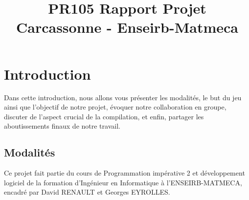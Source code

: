 \documentclass[dvipsnames]{rapportCS}
\title{PR105 Rapport Projet Carcassonne - Enseirb-Matmeca}
\begin{document}






\fairemarges %
\fairepagedegarde %
\setcounter{page}{2}
\setcounter{figure}{0}







\listoffigures
\newpage
\tabledematieres %


\newpage

\section{Introduction}

Dans cette introduction, nous allons vous présenter les modalités, le but du jeu ainsi que l'objectif de notre projet, évoquer notre collaboration en groupe, discuter de l'aspect crucial de la compilation, et enfin, partager les aboutissements finaux de notre travail.

\subsection{Modalités}

Ce projet fait partie du cours de Programmation impérative 2 et développement logiciel de la formation d'Ingénieur en Informatique à l'ENSEIRB-MATMECA, encadré par David RENAULT et Georges EYROLLES.\\
\end{document}
